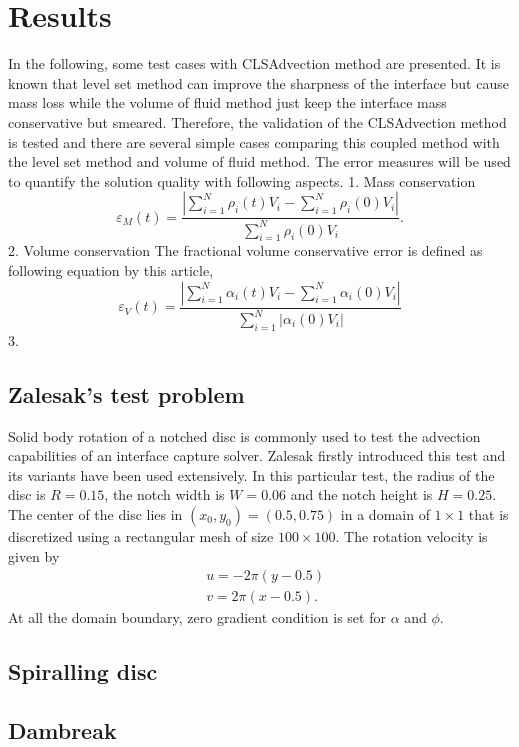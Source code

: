\section{Results}
In the following, some test cases with CLSAdvection method are presented. It is known that level set method can improve the sharpness of the interface but cause mass loss while the volume of fluid method just keep the interface mass conservative but smeared. Therefore, the validation of the CLSAdvection method is tested and there are several simple cases comparing this coupled method with the level set method and volume of fluid method. The error measures will be used to quantify the solution quality with following aspects.
1. Mass conservation
\begin{equation}\label{29}
\varepsilon_{M}(t)=\frac{\left|\sum\limits^N_{i=1}\rho_i(t)V_i-\sum\limits_{i=1}^N\rho_i(0)V_i\right|}{\sum\limits^N_{i=1}\rho_i(0)V_i}.
\end{equation}
2. Volume conservation
The fractional volume conservative error is defined as following equation by this article\cite{gopala2008volume},
\begin{equation}\label{28}
\varepsilon_{V}(t)=\frac{\left|\sum\limits^N_{i=1}\alpha_i(t)V_i-\sum\limits^N_{i=1}\alpha_i(0)V_i\right|}{\sum\limits^N_{i=1}\left|\alpha_{i}(0)V_i\right|}
\end{equation}
3.
\subsection{Zalesak's test problem}
Solid body rotation of a notched disc is commonly used to test the advection capabilities of an interface capture solver. Zalesak firstly introduced this test \citep{zalesak1979fully} and its variants have been used extensively. In this particular test, the radius of the disc is $R=0.15$, the notch width is $W=0.06$ and the notch height is $H=0.25$. The center of the disc lies in $(x_0,y_0)=(0.5,0.75)$ in a domain of $1\times{1}$ that is discretized using a rectangular mesh of size $100\times{100}$. The rotation velocity is given by 
\begin{equation}\label{27}
\begin{split}
&u=-2\pi(y-0.5)
\\
&v=2\pi(x-0.5).
\end{split}
\end{equation}
At all the domain boundary, zero gradient condition is set for $\alpha$ and $\phi$. 



\subsection{Spiralling disc}

\subsection{Dambreak}


